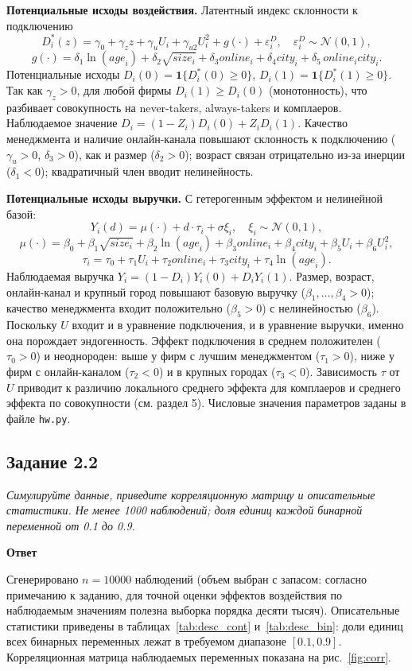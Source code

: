 \documentclass[12pt,a4paper]{article}
\newcommand{\zadanie}[2]{\subsection*{Задание #1}\begingroup\itshape #2\par\endgroup\medskip}
\newcommand{\otvet}{\par\noindent\textbf{Ответ}\par\medskip}
\begin{document}
\textbf{Потенциальные исходы воздействия.} Латентный индекс склонности к подключению
\[
D^{*}_i(z)=\gamma_0+\gamma_z z+\gamma_u U_i+\gamma_{u2}U_i^2+g(\cdot)+\varepsilon^{D}_i,\quad \varepsilon^{D}_i\sim\mathcal{N}(0,1),
\]
\[
g(\cdot)=\delta_1\ln(\textit{age}_i)+\delta_2\sqrt{\textit{size}_i}+\delta_3\textit{online}_i+\delta_4\textit{city}_i+\delta_5\,\textit{online}_i\textit{city}_i.
\]
Потенциальные исходы $D_i(0)=\mathbf{1}\{D^{*}_i(0)\ge0\}$, $D_i(1)=\mathbf{1}\{D^{*}_i(1)\ge0\}$. Так как $\gamma_z>0$, для любой фирмы $D_i(1)\ge D_i(0)$ (монотонность), что разбивает совокупность на never-takers, always-takers и комплаеров. Наблюдаемое значение $D_i=(1-Z_i)D_i(0)+Z_iD_i(1)$. Качество менеджмента и наличие онлайн-канала повышают склонность к подключению ($\gamma_u>0$, $\delta_3>0$), как и размер ($\delta_2>0$); возраст связан отрицательно из-за инерции ($\delta_1<0$); квадратичный член вводит нелинейность.

\textbf{Потенциальные исходы выручки.} С гетерогенным эффектом и нелинейной базой:
\[
Y_i(d)=\mu(\cdot)+d\cdot\tau_i+\sigma\xi_i,\quad \xi_i\sim\mathcal{N}(0,1),
\]
\[
\mu(\cdot)=\beta_0+\beta_1\sqrt{\textit{size}_i}+\beta_2\ln(\textit{age}_i)+\beta_3\textit{online}_i+\beta_4\textit{city}_i+\beta_5U_i+\beta_6U_i^2,
\]
\[
\tau_i=\tau_0+\tau_1U_i+\tau_2\textit{online}_i+\tau_3\textit{city}_i+\tau_4\ln(\textit{age}_i).
\]
Наблюдаемая выручка $Y_i=(1-D_i)Y_i(0)+D_iY_i(1)$. Размер, возраст, онлайн-канал и крупный город повышают базовую выручку ($\beta_1,\dots,\beta_4>0$); качество менеджмента входит положительно ($\beta_5>0$) с нелинейностью ($\beta_6$). Поскольку $U$ входит и в уравнение подключения, и в уравнение выручки, именно она порождает эндогенность. Эффект подключения в среднем положителен ($\tau_0>0$) и неоднороден: выше у фирм с лучшим менеджментом ($\tau_1>0$), ниже у фирм с онлайн-каналом ($\tau_2<0$) и в крупных городах ($\tau_3<0$). Зависимость $\tau$ от $U$ приводит к различию локального среднего эффекта для комплаеров и среднего эффекта по совокупности (см. раздел 5). Числовые значения параметров заданы в файле \texttt{hw.py}.

\zadanie{2.2}{Симулируйте данные, приведите корреляционную матрицу и описательные статистики. Не менее 1000 наблюдений; доля единиц каждой бинарной переменной от 0.1 до 0.9.}
\otvet
Сгенерировано $n=10000$ наблюдений (объем выбран с запасом: согласно примечанию к заданию, для точной оценки эффектов воздействия по наблюдаемым значениям полезна выборка порядка десяти тысяч). Описательные статистики приведены в таблицах~\ref{tab:desc_cont} и~\ref{tab:desc_bin}: доли единиц всех бинарных переменных лежат в требуемом диапазоне $[0.1,0.9]$. Корреляционная матрица наблюдаемых переменных показана на рис.~\ref{fig:corr}.
\end{document}
